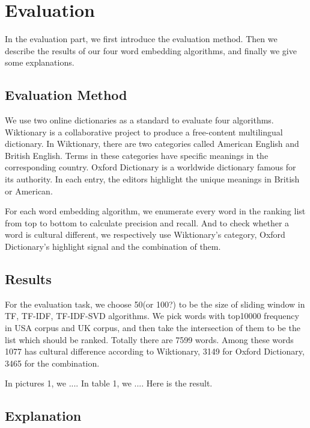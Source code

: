 \section{Evaluation}

In the evaluation part, we first introduce the evaluation method.
Then we describe the results of our four word embedding algorithms,
and finally we give some explanations.


\subsection{Evaluation Method}

We use two online dictionaries as a standard to evaluate four algorithms.
Wiktionary is a collaborative project to produce a free-content multilingual dictionary.
In Wiktionary, there are two categories called American English and British English. Terms in these categories have specific meanings in the corresponding country.
Oxford Dictionary is a worldwide dictionary famous for its authority. In each entry, the editors highlight the unique meanings in British or American.

For each word embedding algorithm, we enumerate every word in the ranking list from top to bottom to calculate precision and recall. And to check whether a word is cultural different, we respectively use
Wiktionary's category, Oxford Dictionary's highlight signal and the combination of them.

\subsection{Results}

For the evaluation task, we choose 50(or 100?) to be the size of sliding window in TF, TF-IDF, TF-IDF-SVD algorithms. We pick words with top10000 frequency in USA corpus and UK corpus, and then take the intersection of them to be the list which should be ranked. Totally there are 7599 words. Among these words 1077 has cultural difference according to Wiktionary, 3149 for Oxford Dictionary, 3465 for the combination.

In pictures 1, we ....
In table 1, we ....
Here is the result.

\subsection{Explanation}

